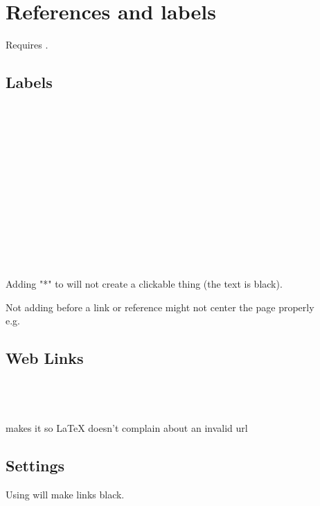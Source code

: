 \vspace{-1cm}
\section{References and labels}\label{labels}
Requires .

\subsection{Labels}
\codeshow{\label{aLabel}}\\
\codeshow{\ref{aLabel}}\\
\codeshow{\ref*{aLabel}}\\
\\
\\
\codeshow{\pageref{aLabel}}\\
\\
\\
\\
\\
\\
\\
\codeshow{\eqref{aLabel}}

Adding "*" to  will not create a clickable thing (the text is black).

Not adding  before a link or reference might not center the page properly\\
e.g. 


\subsection{Web Links}
\\
\\
\\
\code{\nolinkurl} makes it so \LaTeX{} doesn't complain about an invalid url\\

\subsection{Settings}
Using \code{\usepackage[hidelinks]{hyperref}} will make links black.

